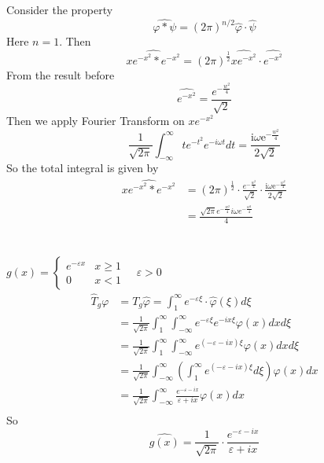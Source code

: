 \documentclass{article}
\begin{document}
\subsection{}
Consider the property
\[
	\widehat{\varphi * \psi}=(2 \pi)^{n / 2} \hat{\varphi} \cdot \hat{\psi}
\]
Here $n=1$. Then
\[
	\widehat{x e^{-x^{2}}*e^{-x^{2}}} = (2 \pi)^{\frac{1}{2}} \widehat{x e^{-x^{2}}}\cdot \widehat{e^{-x^{2}}}
\]
From the result before
\[
	\widehat{e^{-x^{2}}}=\frac{e^{-\frac{w^{2}}{4}}}{\sqrt{2}}
\]
Then we apply Fourier Transform on $x e^{-x^{2}}$
\[
	\frac{1}{\sqrt{2\pi}}\int_{-\infty}^{\infty} t e^{-t^{2}}  e^{-i \omega t} d t = \frac{ \mathrm{i} \omega \mathrm{e}^{-\frac{w^{2}}{4}}}{2\sqrt{2}}
\]
So the total integral is given by
\begin{align*}
	\widehat{x e^{-x^{2}}*e^{-x^{2}}} &= (2 \pi)^{\frac{1}{2}}\cdot \frac{e^{-\frac{w^{2}}{4}}}{\sqrt{2}}\cdot  \frac{ \mathrm{i} \omega \mathrm{e}^{-\frac{w^{2}}{4}}}{2\sqrt{2}}\\
	&=\frac{\sqrt{2 \pi} e^{-\frac{w^{2}}{4}} i \omega e^{-\frac{w^{2}}{4}} }{4}
\end{align*}
\section{}
\subsection{}
$g(x) = \left\{\begin{array}{ll}{e^{-\varepsilon x}} & {x \geq 1} \\ {0} & {x<1}\end{array}\right. \quad \varepsilon>0$
\begin{align*}
	\hat{T}_{g} \varphi&=T_{g} \hat{\varphi}=\int_{1}^{\infty} e^{-\varepsilon \xi} \cdot \hat{\varphi}(\xi) d \xi\\
	&=\frac{1}{\sqrt{2 \pi}} \int_{1}^{\infty} \int_{-\infty}^{\infty} e^{-\varepsilon \xi} e^{-i x \xi} \varphi(x) d x d \xi \\
	&=\frac{1}{\sqrt{2 \pi}} \int_{1}^{\infty} \int_{-\infty}^{\infty} e^{(-\varepsilon -i x )\xi} \varphi(x) d x d \xi \\
	&= \frac{1}{\sqrt{2 \pi}}  \int_{-\infty}^{\infty} \left(\int_{1}^{\infty} e^{(-\varepsilon -i x )\xi} d \xi\right) \varphi(x) d x  \\
	&= \frac{1}{\sqrt{2 \pi}}  \int_{-\infty}^{\infty} \frac{e^{-\varepsilon-ix}}{\varepsilon+ix} \varphi(x) d x  \\
\end{align*}
So 
\[
	\hat{g(x)} =  \frac{1}{\sqrt{2 \pi}}\cdot \frac{e^{-\varepsilon-ix}}{\varepsilon+ix}
\]
\end{document}
